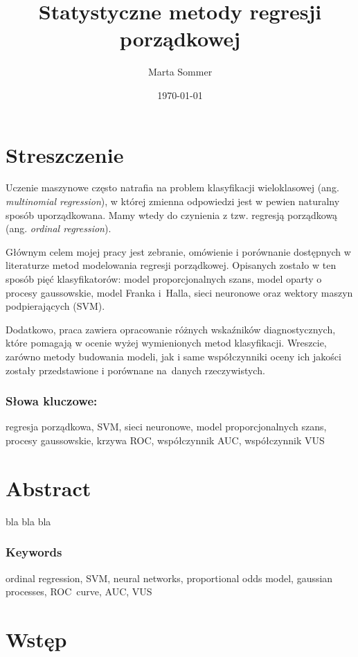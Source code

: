 \documentclass{mini}
\title{Statystyczne metody regresji porządkowej}
\author{Marta Sommer}
\date{\today}
\begin{document}
\maketitle
\tableofcontents

\chapter*{Streszczenie}

Uczenie maszynowe często natrafia na problem klasyfikacji wieloklasowej (ang. \textit{multinomial regression}), w której zmienna odpowiedzi jest w pewien naturalny sposób uporządkowana. Mamy wtedy do czynienia z tzw. regresją porządkową (ang. \textit{ordinal regression}). 

Głównym celem mojej pracy jest zebranie, omówienie i porównanie dostępnych w literaturze metod modelowania regresji porządkowej. Opisanych zostało w ten sposób pięć klasyfikatorów: model proporcjonalnych szans, model oparty o procesy gaussowskie, model Franka i~Halla, sieci neuronowe oraz wektory maszyn podpierających (SVM). 

Dodatkowo, praca zawiera opracowanie różnych wskaźników diagnostycznych, które pomagają w ocenie wyżej wymienionych metod klasyfikacji. Wreszcie, zarówno metody budowania modeli, jak i same współczynniki oceny ich jakości zostały przedstawione i porównane na~danych rzeczywistych. 

\subsection*{Słowa kluczowe:}

regresja porządkowa, SVM, sieci neuronowe, model proporcjonalnych szans, procesy gaussowskie, krzywa ROC, współczynnik AUC, współczynnik VUS 

\chapter*{Abstract}

bla bla bla

\subsection*{Keywords}

ordinal regression, SVM, neural networks, proportional odds model, gaussian processes, ROC~curve, AUC, VUS

\chapter*{Wstęp}
\end{document}
